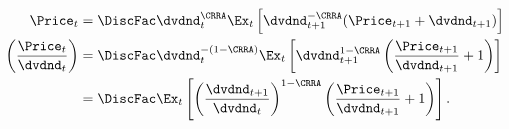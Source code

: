 \begin{equation}\begin{gathered}\begin{aligned}
 \Price_{t} & =  \DiscFac \dvdnd_{t}^{\CRRA} \Ex_{t}\left[\dvdnd_{t+1}^{-\CRRA}(\Price_{t+1}+\dvdnd_{t+1})\right] \label{eq:pofdCRRAWdvdndGro}
\\ \left(\frac{\Price_{t}}{\dvdnd_{t}}\right) & =  \DiscFac \dvdnd_{t}^{-(1-\CRRA)} \Ex_{t}\left[\dvdnd_{t+1}^{1-\CRRA}\left(\frac{\Price_{t+1}}{\dvdnd_{t+1}}+1\right)\right]
\\ & =   \DiscFac  \Ex_{t}\left[\left(\frac{\dvdnd_{t+1}}{\dvdnd_{t}}\right)^{1-\CRRA}\left(\frac{\Price_{t+1}}{\dvdnd_{t+1}}+1\right)\right]
.
\end{aligned}\end{gathered}\end{equation}
